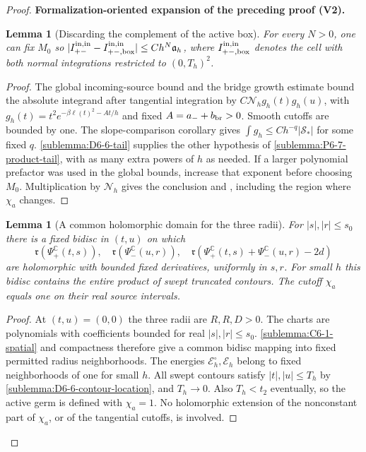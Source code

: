 \documentclass[11pt]{article}
\newtheorem{lemma}[theorem]{Lemma}
\newcommand{\formalisationparentid}{X}
\newenvironment{formalisationaddition}[1]{\par\medskip\begingroup\color{blue}\def\formalisationparentid{#1}\setcounter{formalizationsublemma}{0}\let\lemma\formalizationsublemma\let\endlemma\endformalizationsublemma
  \def\Eo{\mathcal E_h^\circ}\def\EE{\mathcal E_h}\def\phio{\phi_h^\circ}\def\phih{\phi_h}\def\Ho{H_h^{\rm atom}(v^\circ)}\def\Ha{H_h^{\rm atom}}\def\HL{H_h^{L}}\def\Dh{D_h}\def\Log{\operatorname{Log}}\def\ellh{\ell_h}\def\Gp{G_{p,h}}\def\Ast{A_{*,h}}\def\ahat{\widehat{\mathfrak a}_h}\def\ah{\mathfrak a_h}\def\rh{\widehat\rho_h}\def\deltah{\widehat\delta_h}\def\oldref##1{\textup{(##1)}}\def\interface##1{\par\noindent\textit{Analytical interface used here.} ##1\par}\def\finish{\par\noindent\textit{Conclusion of the formalization-oriented expansion.} }\par\noindent\textbf{Formalization-oriented expansion of the preceding proof (V2).}\par\smallskip
}{\par\endgroup\medskip
}
\newcommand{\C}{\mathbb C}
\begin{document}
\begin{proof}
\begin{formalisationaddition}{P6.7}
\begin{lemma}[Discarding the complement of the active box]\label{sublemma:P6-7-real-truncation}
For every $N>0$, one can fix $M_0$ so
$|I_{+-}^{\rm in,in}-I_{+-,\mathrm{box}}^{\rm in,in}|
 \le Ch^N\mathfrak a_h$, where $I_{+-,\mathrm{box}}^{\rm in,in}$ denotes
the cell with both normal integrations restricted to $(0,T_h)^2$.
\end{lemma}
\begin{proof}
The global incoming-source bound and the bridge growth estimate bound
the absolute integrand after tangential integration by
$C\mathcal N_hg_h(t)g_h(u)$, with
$g_h(t)=t^2e^{-\beta\ell(t)^2-At/h}$ and fixed
$A=a_-+b_{\rm br}>0$. Smooth cutoffs are bounded by one.
The slope-comparison corollary gives
$\int g_h\le Ch^{-q}|\mathcal S_*|$ for some fixed $q$.
\ref{sublemma:D6-6-tail} supplies the other hypothesis of
\ref{sublemma:P6-7-product-tail}, with as many extra powers of $h$
as needed. If a larger polynomial prefactor was used in the global
bounds, increase that exponent before choosing $M_0$.
Multiplication by $\mathcal N_h$ gives the conclusion and
, including the region where $\chi_a$ changes.
\end{proof}

\begin{lemma}[A common holomorphic domain for the three radii]\label{sublemma:P6-7-common-domain}
For $|s|,|r|\le s_0$ there is a fixed bidisc in $(t,u)$ on which
\[
 \mathfrak r(\Psi_+^\C(t,s)),\quad
 \mathfrak r(\Psi_-^\C(u,r)),\quad
 \mathfrak r(\Psi_+^\C(t,s)+\Psi_-^\C(u,r)-2d)
\]
are holomorphic with bounded fixed derivatives, uniformly in $s,r$.
For small $h$ this bidisc contains the entire product of swept truncated
contours. The cutoff $\chi_a$ equals one on their real source intervals.
\end{lemma}
\begin{proof}
At $(t,u)=(0,0)$ the three radii are $R,R,D>0$.
The charts are polynomials with coefficients bounded for real
$|s|,|r|\le s_0$.
\ref{sublemma:C6-1-spatial} and compactness therefore give a common
bidisc mapping into fixed permitted radius neighborhoods. The energies
$\Eo,\EE$ belong to fixed neighborhoods of one for small $h$.
All swept contours satisfy $|t|,|u|\le T_h$ by
\ref{sublemma:D6-6-contour-location}, and $T_h\to0$.
Also $T_h<t_2$ eventually, so the active germ is defined with
$\chi_a=1$. No holomorphic extension of the nonconstant part of
$\chi_a$, or of the tangential cutoffs, is involved.
\end{proof}


\end{formalisationaddition}
\end{proof}
\end{document}
